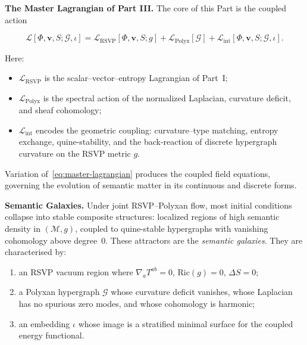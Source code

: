 \documentclass[../../main]{subfiles}
\begin{document}
\medskip

\noindent
\textbf{The Master Lagrangian of Part III.}  
The core of this Part is the coupled action

\begin{equation}
\label{eq:master-lagrangian}
\mathcal{L}[\Phi,\mathbf{v},S;\mathcal{G},\iota]
  = \mathcal{L}_{\mathrm{RSVP}}[\Phi,\mathbf{v},S;g]
  + \mathcal{L}_{\mathrm{Polyx}}[\mathcal{G}]
  + \mathcal{L}_{\mathrm{int}}[\Phi,\mathbf{v},S;\mathcal{G},\iota].
\end{equation}

Here:

\begin{itemize}
\item $\mathcal{L}_{\mathrm{RSVP}}$ is the scalar--vector--entropy Lagrangian
      of Part~I;  
\item $\mathcal{L}_{\mathrm{Polyx}}$ is the spectral action of the
      normalized Laplacian, curvature deficit, and sheaf cohomology;  
\item $\mathcal{L}_{\mathrm{int}}$ encodes the geometric coupling:
      curvature–type matching, entropy exchange, quine-stability,
      and the back-reaction of discrete hypergraph curvature on the
      RSVP metric $g$.
\end{itemize}

Variation of~\eqref{eq:master-lagrangian} produces the coupled field
equations, governing the evolution of semantic matter in its continuous and
discrete forms.

\medskip

\noindent
\textbf{Semantic Galaxies.}  
Under joint RSVP--Polyxan flow, most initial conditions collapse into
stable composite structures:  
localized regions of high semantic density in $(\mathcal{M},g)$, coupled
to quine-stable hypergraphs with vanishing cohomology above degree~0.
These attractors are the \emph{semantic galaxies}.  
They are characterised by:

\begin{enumerate}[label=\textbf{(\roman*)}]
\item an RSVP vacuum region where
      $\nabla_a T^{ab}=0$,  
      $\mathrm{Ric}(g)=0$,  
      $\Delta S=0$;  
\item a Polyxan hypergraph $\mathcal{G}$ whose curvature deficit
      vanishes,  
      whose Laplacian has no spurious zero modes,  
      and whose cohomology is harmonic;  
\item an embedding $\iota$ whose image is a stratified minimal surface
      for the coupled energy functional.
\end{enumerate}
\end{document}
